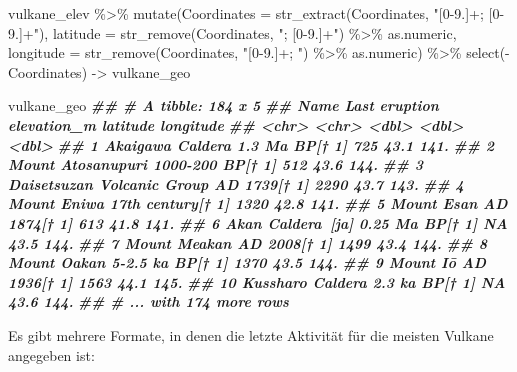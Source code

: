 \documentclass[
  ngerman,
]{article}
\newenvironment{Shaded}{\begin{snugshade}}{\end{snugshade}}
\newcommand{\AttributeTok}[1]{\textcolor[rgb]{0.77,0.63,0.00}{#1}}
\newcommand{\DocumentationTok}[1]{\textcolor[rgb]{0.56,0.35,0.01}{\textbf{\textit{#1}}}}
\newcommand{\FunctionTok}[1]{\textcolor[rgb]{0.00,0.00,0.00}{#1}}
\newcommand{\NormalTok}[1]{#1}
\newcommand{\OtherTok}[1]{\textcolor[rgb]{0.56,0.35,0.01}{#1}}
\newcommand{\SpecialCharTok}[1]{\textcolor[rgb]{0.00,0.00,0.00}{#1}}
\newcommand{\StringTok}[1]{\textcolor[rgb]{0.31,0.60,0.02}{#1}}
\begin{document}
\begin{Shaded}
\begin{Highlighting}[]
\NormalTok{vulkane\_elev }\SpecialCharTok{\%\textgreater{}\%}
  \FunctionTok{mutate}\NormalTok{(}\AttributeTok{Coordinates =} \FunctionTok{str\_extract}\NormalTok{(Coordinates, }\StringTok{"[0{-}9.]+; [0{-}9.]+"}\NormalTok{),}
         \AttributeTok{latitude =} \FunctionTok{str\_remove}\NormalTok{(Coordinates, }\StringTok{"; [0{-}9.]+"}\NormalTok{) }\SpecialCharTok{\%\textgreater{}\%}\NormalTok{ as.numeric,}
         \AttributeTok{longitude =} \FunctionTok{str\_remove}\NormalTok{(Coordinates, }\StringTok{"[0{-}9.]+; "}\NormalTok{) }\SpecialCharTok{\%\textgreater{}\%}\NormalTok{ as.numeric) }\SpecialCharTok{\%\textgreater{}\%}
  \FunctionTok{select}\NormalTok{(}\SpecialCharTok{{-}}\NormalTok{Coordinates) }\OtherTok{{-}\textgreater{}}\NormalTok{ vulkane\_geo}

\NormalTok{vulkane\_geo}
\DocumentationTok{\#\# \# A tibble: 184 x 5}
\DocumentationTok{\#\#    Name                       \textasciigrave{}Last eruption\textasciigrave{}   elevation\_m latitude longitude}
\DocumentationTok{\#\#    \textless{}chr\textgreater{}                      \textless{}chr\textgreater{}                   \textless{}dbl\textgreater{}    \textless{}dbl\textgreater{}     \textless{}dbl\textgreater{}}
\DocumentationTok{\#\#  1 Akaigawa Caldera           1.3 Ma BP[† 1]            725     43.1      141.}
\DocumentationTok{\#\#  2 Mount Atosanupuri          1000{-}200 BP[† 1]          512     43.6      144.}
\DocumentationTok{\#\#  3 Daisetsuzan Volcanic Group AD 1739[† 1]             2290     43.7      143.}
\DocumentationTok{\#\#  4 Mount Eniwa                17th century[† 1]        1320     42.8      141.}
\DocumentationTok{\#\#  5 Mount Esan                 AD 1874[† 1]              613     41.8      141.}
\DocumentationTok{\#\#  6 Akan Caldera [ja]          0.25 Ma BP[† 1]            NA     43.5      144.}
\DocumentationTok{\#\#  7 Mount Meakan               AD 2008[† 1]             1499     43.4      144.}
\DocumentationTok{\#\#  8 Mount Oakan                5{-}2.5 ka BP[† 1]         1370     43.5      144.}
\DocumentationTok{\#\#  9 Mount Iō                   AD 1936[† 1]             1563     44.1      145.}
\DocumentationTok{\#\# 10 Kussharo Caldera           2.3 ka BP[† 1]             NA     43.6      144.}
\DocumentationTok{\#\# \# ... with 174 more rows}
\end{Highlighting}
\end{Shaded}

Es gibt mehrere Formate, in denen die letzte Aktivität für die meisten Vulkane angegeben ist:
\end{document}

